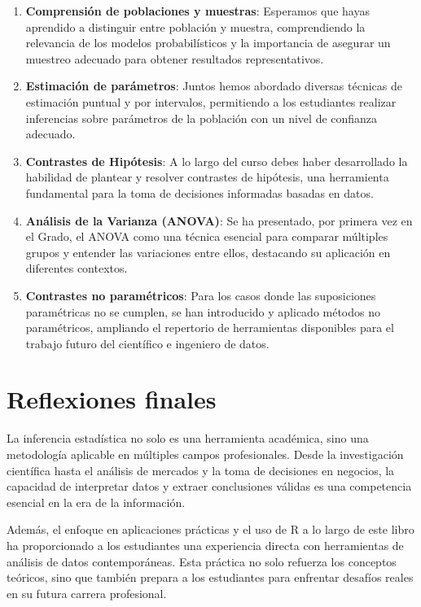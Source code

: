 \documentclass[
  letterpaper,
  DIV=11,
  numbers=noendperiod]{scrreprt}
\begin{document}
\begin{enumerate}
\def\labelenumi{\arabic{enumi}.}
\item
  \textbf{Comprensión de poblaciones y muestras}: Esperamos que hayas
  aprendido a distinguir entre población y muestra, comprendiendo la
  relevancia de los modelos probabilísticos y la importancia de asegurar
  un muestreo adecuado para obtener resultados representativos.
\item
  \textbf{Estimación de parámetros}: Juntos hemos abordado diversas
  técnicas de estimación puntual y por intervalos, permitiendo a los
  estudiantes realizar inferencias sobre parámetros de la población con
  un nivel de confianza adecuado.
\item
  \textbf{Contrastes de Hipótesis}: A lo largo del curso debes haber
  desarrollado la habilidad de plantear y resolver contrastes de
  hipótesis, una herramienta fundamental para la toma de decisiones
  informadas basadas en datos.
\item
  \textbf{Análisis de la Varianza (ANOVA)}: Se ha presentado, por
  primera vez en el Grado, el ANOVA como una técnica esencial para
  comparar múltiples grupos y entender las variaciones entre ellos,
  destacando su aplicación en diferentes contextos.
\item
  \textbf{Contrastes no paramétricos}: Para los casos donde las
  suposiciones paramétricas no se cumplen, se han introducido y aplicado
  métodos no paramétricos, ampliando el repertorio de herramientas
  disponibles para el trabajo futuro del científico e ingeniero de
  datos.
\end{enumerate}

\hypertarget{reflexiones-finales}{%
\section{Reflexiones finales}\label{reflexiones-finales}}

La inferencia estadística no solo es una herramienta académica, sino una
metodología aplicable en múltiples campos profesionales. Desde la
investigación científica hasta el análisis de mercados y la toma de
decisiones en negocios, la capacidad de interpretar datos y extraer
conclusiones válidas es una competencia esencial en la era de la
información.

Además, el enfoque en aplicaciones prácticas y el uso de R a lo largo de
este libro ha proporcionado a los estudiantes una experiencia directa
con herramientas de análisis de datos contemporáneas. Esta práctica no
solo refuerza los conceptos teóricos, sino que también prepara a los
estudiantes para enfrentar desafíos reales en su futura carrera
profesional.
\end{document}

